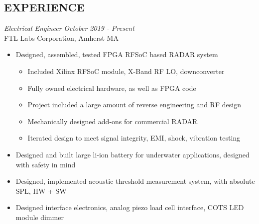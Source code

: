 \documentclass[line,mmmargin]{res}
\begin{document}
\begin{resume}
\section{EXPERIENCE} 
{\sl Electrical Engineer} \hfill {\sl October 2019 - Present}\\
	FTL Labs Corporation, Amherst MA
	\begin{itemize}  \itemsep -2pt %
        \item Designed, assembled, tested FPGA RFSoC based RADAR system
	\vspace{-3pt}
	\begin{itemize}  \itemsep -4pt %
        \item Included Xilinx RFSoC module, X-Band RF LO, downconverter
        \item Fully owned electrical hardware, as well as FPGA code
        \item Project included a large amount of reverse engineering and RF design
        \item Mechanically designed add-ons for commercial RADAR
        \item Iterated design to meet signal integrity, EMI, shock, vibration testing
    \end{itemize}
	\vspace{-2pt}
		\item Designed and built large li-ion battery for
			underwater applications, designed with safety in mind
        \item Designed, implemented acoustic threshold measurement system, 
            with absolute SPL, HW + SW
		\item Designed interface electronics, analog piezo
			load cell interface, COTS LED module dimmer

\end{itemize}
\end{resume}
\end{document}
